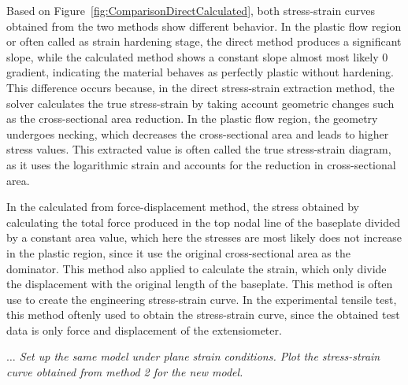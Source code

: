 \documentclass[12pt]{article}
\begin{document}
\hspace{2em}Based on Figure~\ref{fig:ComparisonDirectCalculated}, both stress-strain curves obtained from the two 
methods show different behavior. In the plastic flow region or often called as strain hardening stage, 
the direct method produces a significant slope, while the calculated method shows a constant slope almost most likely 0 gradient, 
indicating the material behaves as perfectly plastic without hardening. 
This difference occurs because, in the direct stress-strain extraction method, the solver calculates the true stress-strain 
by taking account geometric changes such as the cross-sectional area reduction. In the plastic flow
region, the geometry undergoes necking, which decreases the cross-sectional area and leads to higher 
stress values. This extracted value is often called the true stress-strain diagram, as it uses the logarithmic 
strain and accounts for the reduction in cross-sectional area.

\hspace{2em}In the calculated from force-displacement method, the stress obtained by calculating the total force produced in the top nodal line of the baseplate divided by a constant area value, which here
the stresses are most likely does not increase in the plastic region, since it use the original cross-sectional area as the dominator. This method also applied to calculate the strain, which only
divide the displacement with the original length of the baseplate. This method is often use to create the engineering stress-strain curve. In the experimental tensile test, 
this method oftenly used to obtain the stress-strain curve, since the obtained test data is only force and displacement of the extensiometer. 

\vspace{1em}
\textit{$\dots$ Set up the same model under plane strain conditions. Plot the stress-strain curve obtained from
method 2 for the new model.}
\end{document}
